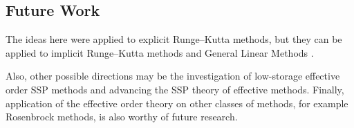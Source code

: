 \subsection{Future Work}\label{subsec:future_work}
The ideas here were applied to explicit Runge--Kutta methods, but they
can be applied to implicit Runge--Kutta methods and General Linear
Methods \cite{Butcher2008_book}.

Also, other possible directions may be the investigation of low-storage 
effective order SSP methods and advancing the SSP theory of effective 
methods. 
Finally, application of the effective order theory on other classes of 
methods, for example Rosenbrock methods, is also worthy of future 
research.